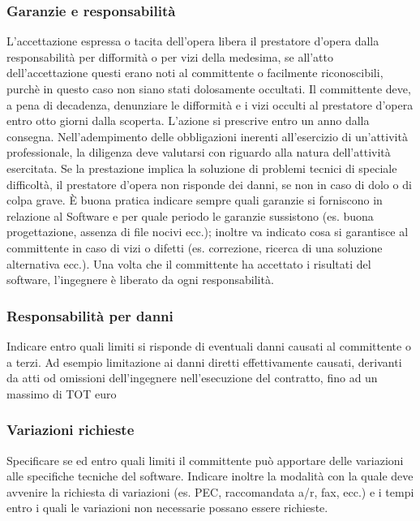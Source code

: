 \subsubsection{Garanzie e responsabilità}
L'accettazione espressa o tacita dell'opera libera il prestatore d'opera dalla
responsabilità per difformità o per vizi della medesima, se all'atto
dell'accettazione questi erano noti al committente o facilmente riconoscibili,
purchè in questo caso non siano stati dolosamente occultati.\newline
Il committente deve, a pena di decadenza, denunziare le difformità e i vizi occulti al prestatore d'opera entro otto giorni
dalla scoperta. L'azione si prescrive entro un anno dalla consegna.\newline
Nell'adempimento delle obbligazioni inerenti all'esercizio di un'attività
professionale, la diligenza deve valutarsi con riguardo alla natura
dell'attività esercitata.\newline
Se la prestazione implica la soluzione di problemi tecnici di speciale
difficoltà, il prestatore d'opera non risponde dei danni,
se non in caso di dolo o di colpa grave.\newline
È buona pratica indicare sempre quali garanzie si forniscono in relazione al Software e per quale periodo le garanzie sussistono (es.
buona progettazione, assenza di file nocivi ecc.); inoltre va indicato cosa si garantisce al committente in caso di vizi o difetti
(es. correzione, ricerca di una soluzione alternativa ecc.).\newline
Una volta che il committente ha accettato i risultati del software, l'ingegnere è liberato da ogni responsabilità.

\subsubsection{Responsabilità per danni}
Indicare entro quali limiti si risponde di eventuali danni causati al committente o a terzi. Ad esempio limitazione ai danni
diretti effettivamente causati, derivanti da atti od omissioni dell'ingegnere nell'esecuzione del contratto, fino ad un massimo
di TOT euro

\subsubsection{Variazioni richieste}
Specificare se ed entro quali limiti il committente può apportare delle variazioni alle specifiche tecniche del software. Indicare inoltre la modalità
con la quale deve avvenire la richiesta di variazioni (es. PEC, raccomandata a/r, fax, ecc.) e i tempi entro i quali
le variazioni non necessarie possano essere richieste.

